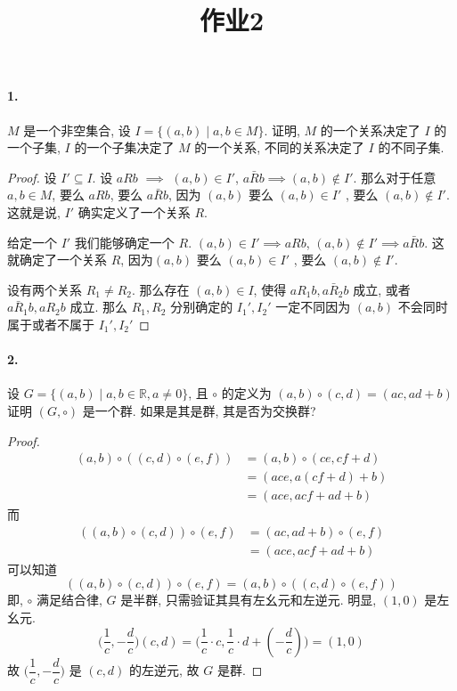 \documentclass[12pt]{ctexart}
\theoremstyle{definition}
\theoremstyle{definition}
\theoremstyle{plain}
\theoremstyle{remark}
\begin{document}
\title{作业2}
\maketitle
\paragraph{1. }\(M\) 是一个非空集合, 设 \(I = \{ (a, b ) \mid a , b \in M\}\). 证明, \(M\) 的一个关系决定了 \(I\) 的一个子集, \(I\) 的一个子集决定了 \(M\) 的一个关系, 不同的关系决定了 \(I\) 的不同子集. 
\begin{proof}
	设 \(I ' \subseteq I\). 
	设 \(a R b\) \(\implies\) \( (a, b ) \in I'\), \( a \bar R b \implies ( a ,b ) \notin I'\). 那么对于任意 \(a, b \in M\), 要么 \(a R b\), 要么 \( a \bar R b \), 因为
	\((a, b ) \) 要么 \( ( a, b ) \in  I' \) , 要么 \( (a, b ) \notin I' \). 这就是说, \(I'\) 确实定义了一个关系 \(R\). 

	给定一个 \(I'\) 我们能够确定一个 \(R\). \((a, b ) \in I' \implies a R b \), \( ( a, b) \notin I' \implies a \bar R b \). 这就确定了一个关系 \(R\), 因为\((a, b ) \) 要么 \( ( a, b ) \in  I' \) , 要么 \( (a, b ) \notin I' \).  

	设有两个关系 \(R _{1}\ne R_2\). 那么存在 \((a, b ) \in  I\), 使得 \( a R _{1} b, a \bar R_2 b\) 成立, 或者 \(a \bar R_1 b, a R_2b\) 成立. 那么 \(R_1 , R_2\) 分别确定的 \(I_1' , I_2'\) 一定不同因为 \((a, b )\) 不会同时属于或者不属于 \(I_1', I_2'\)
\end{proof}


\paragraph{2. }设 \(G = \{ (a, b ) \mid a, b \in \mathbb{R} , a \ne 0 \}\), 且 \(\circ\) 的定义为 \( (a, b ) \circ (c ,d ) = ( a c , ad + b ) \) 证明 \( ( G , \circ ) \) 是一个群. 如果是其是群, 其是否为交换群? 
\begin{proof}
\[
	\begin{aligned}
		(a , b ) \circ (( c, d )  \circ (e ,f ) )
		& =  (a,  b ) \circ ( c e , cf + d )   \\
		& =  ( ace , a (cf + d) + b )  \\ 
		& = (ace , a cf + ad + b ) 
	\end{aligned}
\]
而 
\[
	\begin{aligned}
		(( a, b) \circ ( c , d )) \circ (e ,f )  
		& = (  ac , ad + b ) \circ (e ,f ) \\ 
		& = ( ace , acf + ad +b ) 
	\end{aligned}
\]
可以知道 
\[
	(( a, b ) \circ ( c ,d )) \circ ( e, f ) = ( a, b ) \circ( ( c ,d ) \circ ( e, f ))
\]
即, \(\circ\) 满足结合律, \(G\) 是半群, 只需验证其具有左幺元和左逆元. 
	明显, \( ( 1 , 0 ) \) 是左幺元. 
\[
	\big(\frac{1}{c} , - \frac{d}{c} \big) ( c ,d ) = \big( \frac{1}{c} \cdot c , \frac{1}{c} \cdot d + (- \frac{d}{c}) \big) = (1, 0) 
\]
	故 \(\Big(\dfrac{1}{c} , - \dfrac{d}{c}\Big)\) 是 \( (c, d ) \) 的左逆元, 故 \(G\) 是群. 
\end{proof}
\end{document}
